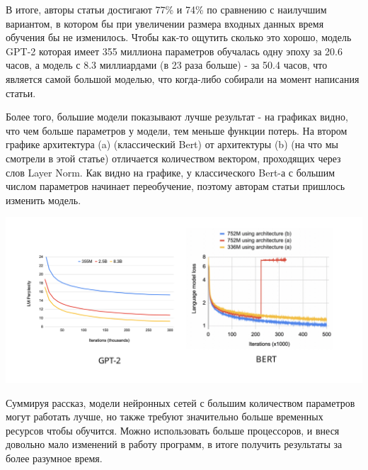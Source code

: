 В итоге, авторы статьи достигают 77\% и 74\% по сравнению с наилучшим вариантом, в котором бы при увеличении размера входных данных время обучения бы не изменилось. Чтобы как-то ощутить сколько это хорошо, модель GPT-2 которая имеет 355 миллиона параметров обучалась одну эпоху за 20.6 часов, а модель с 8.3 миллиардами (в 23 раза больше) - за 50.4 часов, что является самой большой моделью, что когда-либо собирали на момент написания статьи.

Более того, большие модели показывают лучше результат - на графиках видно, что чем больше параметров у модели, тем меньше функции потерь. На втором графике архитектура (a) (классический Bert) от архитектуры (b) (на что мы смотрели в этой статье) отличается количеством вектором, проходящих через слов Layer Norm. Как видно на графике, у классического Bert-а с большим числом параметров начинает переобучение, поэтому авторам статьи пришлось изменить модель.  

\includegraphics[width=0.8\linewidth]{images/TP_loss.png}

Суммируя рассказ, модели нейронных сетей с большим количеством параметров могут работать лучше, но также требуют значительно больше временных ресурсов чтобы обучится. Можно использовать больше процессоров, и внеся довольно мало изменений в работу программ, в итоге получить результаты за более разумное время.
